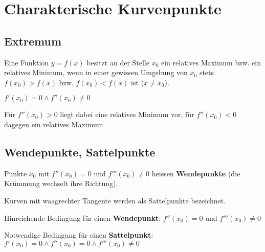 \documentclass[a4paper,DIV10,12pt,headsepline,smallheadings,halfparskip-]{scrreprt}
\begin{document}
	\section{Charakterische Kurvenpunkte} %
	\label{sec:charakterische_kurvenpunkte}
	\subsection{Extremum} %
	\label{sub:extremum}
	Eine Funktion \(y = f(x) \) besitzt an der Stelle \(x_0\) ein relatives Maximum bzw. ein relatives Minimum, wenn in einer gewissen Umgebung von \(x_0\) stets \newline
	\(f(x_0) > f(x) \) bzw. \( f(x_0) < f(x) \) \newline
	ist (\(x \neq x_0\)).\newline

	\( f'(x_0) = 0 \wedge f''(x_0) \neq 0 \)

	Für \(f''(x_0) > 0 \) liegt dabei eine relatives Minimum vor, für \(f''(x_0) < 0 \) dagegen ein relatives Maximum.
	\subsection{Wendepunkte, Sattelpunkte} %
	Punkte \(x_0\) mit \(f''(x_0) = 0 \) und \(f'''(x_0) \neq 0 \) heissen \textbf{Wendepunkte} (die Krümmung wechselt ihre Richtung).
	\par Kurven mit waagrechter Tangente werden als Sattelpunkte bezeichnet.
	\par Hinreichende Bedingung für einen \textbf{Wendepunkt}: \newline
	\(f''(x_0) = 0 \) und \( f'''(x_0) \neq 0 \)
	\par Notwendige Bedingung für einen \textbf{Sattelpunkt}: \newline
	\(f'(x_0) = 0 \wedge f''(x_0) = 0 \wedge f'''(x_0) \neq 0 \)

\end{document}

